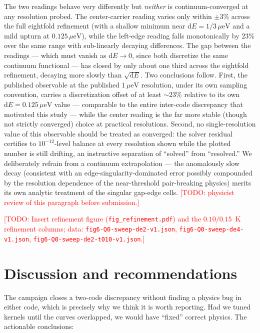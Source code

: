 \documentclass[reprint,amsmath,amssymb,aps,prapplied,nofootinbib]{revtex4-2}
\newcommand{\todo}[1]{\textcolor{red}{[TODO: #1]}}
\newcommand{\ueV}{\,\mu\mathrm{eV}}
\begin{document}
\noindent
The two readings behave very differently but \emph{neither} is
continuum-converged at any resolution probed.  The center-carrier
reading varies only within $\pm 3\%$ across the full eightfold
refinement (with a shallow minimum near $\mathrm{d}E = 1/3\ueV$ and a
mild upturn at $0.125\ueV$), while the left-edge reading falls
monotonically by $23\%$ over the same range with sub-linearly decaying
differences.  The gap between the readings --- which must vanish as
$\mathrm{d}E \to 0$, since both discretize the same continuum
functional --- has closed by only about one third across the eightfold
refinement, decaying more slowly than $\sqrt{\mathrm{d}E}$.  Two
conclusions follow.  First, the published observable at the published
$1\ueV$ resolution, under its own sampling convention, carries a
discretization offset of at least $\sim 23\%$ relative to its own
$\mathrm{d}E = 0.125\ueV$ value --- comparable to the entire
inter-code discrepancy that motivated this study --- while the
center reading is the far more stable (though not strictly converged)
choice at practical resolutions.  Second, no single-resolution value of
this observable should be treated as converged: the solver residual
certifies to $10^{-12}$-level balance at every resolution shown while
the plotted number is still drifting, an instructive separation of
``solved'' from ``resolved.''  We deliberately refrain from a
continuum extrapolation --- the anomalously slow decay (consistent
with an edge-singularity-dominated error possibly compounded by the
resolution dependence of the near-threshold pair-breaking physics)
merits its own analytic treatment of the singular gap-edge cells.
\todo{physicist review of this paragraph before submission.}

\todo{Insert refinement figure (\texttt{fig\_refinement.pdf}) and the
$0.10/0.15$~K refinement columns; data:
\texttt{fig6-Q0-sweep-de2-v1.json}, \texttt{fig6-Q0-sweep-de4-v1.json},
\texttt{fig6-Q0-sweep-de2-t010-v1.json}.}

\section{Discussion and recommendations}

The campaign closes a two-code discrepancy without finding a physics bug
in either code, which is precisely why we think it is worth reporting.
Had we tuned kernels until the curves overlapped, we would have
``fixed'' correct physics.  The actionable conclusions:
\end{document}
